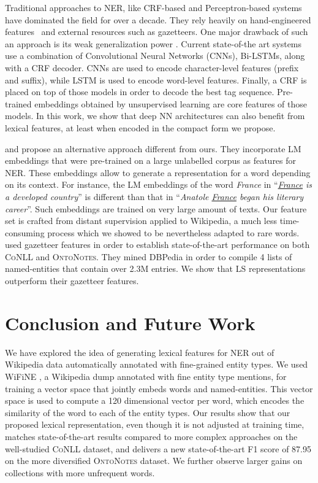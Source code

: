 \documentclass[11pt]{article}
\newcommand{\conll}{\textsc{CoNLL}}
\newcommand{\onto}{\textsc{OntoNotes}}
\newcommand{\lr}{\textsc{LS}}
\newcommand{\wifine}{WiFiNE}
\begin{document}
	
	Traditional approaches to NER, like CRF-based \cite{finkel2005incorporating} and Perceptron-based systems \cite{ratinov2009design} have dominated the field for over a decade. They rely heavily on hand-engineered features~\cite{luo-2015} and external resources such as gazetteers. One major drawback of such an  approach is its weak generalization power \cite{lample2016neural}.
	Current state-of-the art systems~\cite{chiu2015named,strubell2017fast} use a combination of Convolutional Neural Networks (CNNs), Bi-LSTMs, along with a CRF decoder. CNNs are used to encode character-level features (prefix and suffix), while LSTM is used to encode word-level features. Finally, a CRF is placed on top of those models in order to decode the best tag sequence. Pre-trained embeddings obtained by unsupervised learning are core features of those models.  In this work, we show that deep NN architectures can also benefit from lexical features, at least when encoded in the compact form we propose. 
	
	 and  propose an alternative approach different from ours. They incorporate LM embeddings that were pre-trained on a large unlabelled corpus as features for NER. These embeddings allow to generate a representation for a word depending on its context. For instance, the LM embeddings of the word \textit{France} in \enquote{\textit{\underline{France} is a developed country}} is different than that in \enquote{\textit{Anatole \underline{France} began his literary career}}. Such embeddings are trained on very large amount of texts. Our feature set is crafted from distant supervision applied to Wikipedia, a much less time-consuming process which we showed to be nevertheless adapted to rare words.		
	 used gazetteer features in order to establish state-of-the-art performance on both \conll{ } and \onto{}. They mined DBPedia in order to compile 4 lists of  named-entities that contain over 2.3M entries. We show that \lr{} representations outperform their gazetteer features. 

	
	\section{Conclusion and Future Work}
	\label{sec:conclusion}
	
	We have explored the idea of generating lexical features for NER out of Wikipedia data automatically annotated with fine-grained entity types. We used \wifine{ }\cite{ghaddara2018wifine}, a Wikipedia dump annotated with fine entity type mentions, for training a vector space that jointly embeds words and named-entities. This vector space is used to compute a 120 dimensional vector per word, which encodes the similarity of the word to each of the entity types. Our results show that our proposed lexical representation, even though it is not adjusted at training time, matches state-of-the-art results compared to more complex approaches on the well-studied \conll{} dataset, and delivers a new state-of-the-art F1 score of 87.95 on the more diversified \onto{} dataset. We further observe larger gains  on collections  with more unfrequent words. 
\end{document}
